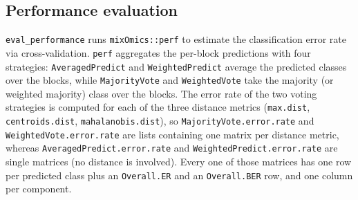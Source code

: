 \documentclass[
]{book}
\newenvironment{Shaded}{\begin{snugshade}}{\end{snugshade}}
\newcommand{\AttributeTok}[1]{\textcolor[rgb]{0.13,0.29,0.53}{#1}}
\newcommand{\CommentTok}[1]{\textcolor[rgb]{0.56,0.35,0.01}{\textit{#1}}}
\newcommand{\DecValTok}[1]{\textcolor[rgb]{0.00,0.00,0.81}{#1}}
\newcommand{\FunctionTok}[1]{\textcolor[rgb]{0.13,0.29,0.53}{\textbf{#1}}}
\newcommand{\NormalTok}[1]{#1}
\newcommand{\SpecialCharTok}[1]{\textcolor[rgb]{0.81,0.36,0.00}{\textbf{#1}}}
\newcommand{\StringTok}[1]{\textcolor[rgb]{0.31,0.60,0.02}{#1}}
\begin{document}
\subsection{Performance evaluation}\label{performance-evaluation}

\texttt{eval\_performance} runs \texttt{mixOmics::perf} to estimate the classification error rate via cross-validation.
\texttt{perf} aggregates the per-block predictions with four strategies: \texttt{AveragedPredict} and \texttt{WeightedPredict} average the predicted classes over the blocks, while \texttt{MajorityVote} and \texttt{WeightedVote} take the majority (or weighted majority) class over the blocks.
The error rate of the two voting strategies is computed for each of the three distance metrics (\texttt{max.dist}, \texttt{centroids.dist}, \texttt{mahalanobis.dist}), so \texttt{MajorityVote.error.rate} and \texttt{WeightedVote.error.rate} are lists containing one matrix per distance metric, whereas \texttt{AveragedPredict.error.rate} and \texttt{WeightedPredict.error.rate} are single matrices (no distance is involved).
Every one of those matrices has one row per predicted class plus an \texttt{Overall.ER} and an \texttt{Overall.BER} row, and one column per component.

\begin{Shaded}
\end{Shaded}
\end{document}
